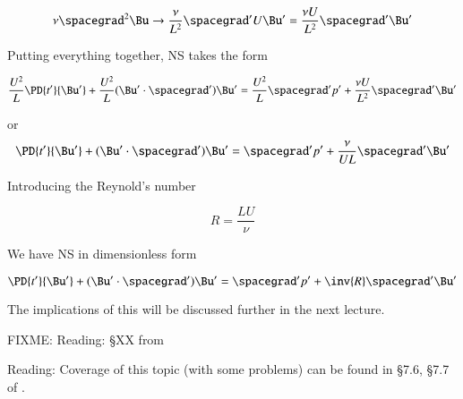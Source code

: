 \begin{equation}\label{eqn:continuumL14:430}
\nu \spacegrad^2 \Bu \rightarrow \frac{\nu}{L^2} \spacegrad' U \Bu' = \frac{\nu U}{L^2} \spacegrad' \Bu'
\end{equation}

Putting everything together, NS takes the form

\begin{equation}\label{eqn:continuumL14:450}
\frac{U^2}{L} \PD{t'}{\Bu'} + \frac{U^2}{L} (\Bu' \cdot \spacegrad') \Bu' = \frac{U^2}{L} \spacegrad' p' + \frac{\nu U}{L^2} \spacegrad' \Bu'
\end{equation}

or
\begin{equation}\label{eqn:continuumL14:470}
\PD{t'}{\Bu'} + (\Bu' \cdot \spacegrad') \Bu' = \spacegrad' p' + \frac{\nu}{U L} \spacegrad' \Bu'
\end{equation}

Introducing the Reynold's number

\begin{equation}\label{eqn:continuumL14:490}
R = \frac{L U}{\nu}
\end{equation}

We have NS in dimensionless form

\begin{equation}\label{eqn:continuumL14:510}
\PD{t'}{\Bu'} + (\Bu' \cdot \spacegrad') \Bu' = \spacegrad' p' + \inv{R} \spacegrad' \Bu'
\end{equation}

The implications of this will be discussed further in the next lecture.

FIXME: Reading: \S XX from \cite{acheson1990elementary}

Reading: Coverage of this topic (with some problems) can be found in \S 7.6, \S 7.7 of \cite{granger1995fluid}.

\EndArticle
